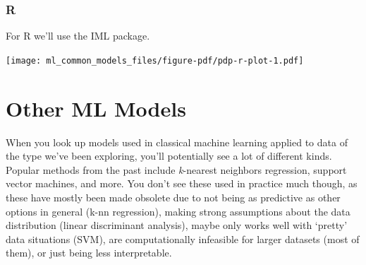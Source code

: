 \documentclass[
  letterpaper,
]{krantz}
\newenvironment{Shaded}{}{}
\newcommand{\AttributeTok}[1]{\textcolor[rgb]{0.49,0.56,0.16}{#1}}
\newcommand{\ConstantTok}[1]{\textcolor[rgb]{0.53,0.00,0.00}{#1}}
\newcommand{\FunctionTok}[1]{\textcolor[rgb]{0.02,0.16,0.49}{#1}}
\newcommand{\NormalTok}[1]{#1}
\newcommand{\OtherTok}[1]{\textcolor[rgb]{0.00,0.44,0.13}{#1}}
\newcommand{\SpecialCharTok}[1]{\textcolor[rgb]{0.25,0.44,0.63}{#1}}
\newcommand{\StringTok}[1]{\textcolor[rgb]{0.25,0.44,0.63}{#1}}
\begin{document}
\subsubsection{R}

For R we'll use the IML package.

\begin{Shaded}
\end{Shaded}

\texttt{[image: ml\_common\_models\_files/figure-pdf/pdp-r-plot-1.pdf]}

\section{Other ML Models}\label{other-ml-models}

When you look up models used in classical machine learning applied to
data of the type we've been exploring, you'll potentially see a lot of
different kinds. Popular methods from the past include \emph{k}-nearest
neighbors regression, support vector machines, and more. You don't see
these used in practice much though, as these have mostly been made
obsolete due to not being as predictive as other options in general
(k-nn regression), making strong assumptions about the data distribution
(linear discriminant analysis), maybe only works well with `pretty' data
situations (SVM), are computationally infeasible for larger datasets
(most of them), or just being less interpretable.
\end{document}
